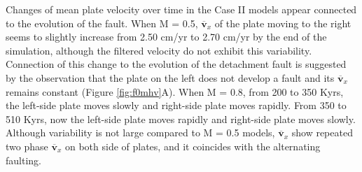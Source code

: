 \documentclass[letterpaper,12pt,notitle]{memphisthesis}                     %
\begin{document}

%

Changes of mean plate velocity over time in the Case II models appear connected to the evolution of the fault.
When M = 0.5, $\overline{\boldsymbol{v}}_{x}$ of the plate moving to the right seems to slightly increase from 2.50 cm/yr to 2.70 cm/yr by the end of the simulation, although the filtered velocity do not exhibit this variability. Connection of this change to the evolution of the detachment fault is suggested by the observation that the plate on the left does not develop a fault and its $\overline{\boldsymbol{v}}_{x}$ remains constant (Figure \ref{fig:f0mhv}A). When M = 0.8, from 200 to 350 Kyrs, the left-side plate moves slowly and right-side plate moves rapidly. From 350 to 510 Kyrs, now the left-side plate moves rapidly and right-side plate moves slowly. Although variability is not large compared to M = 0.5 models, $\overline{\boldsymbol{v}}_{x}$ show repeated two phase $\overline{\boldsymbol{v}}_{x}$ on both side of plates, and it coincides with the alternating faulting.
\end{document}
